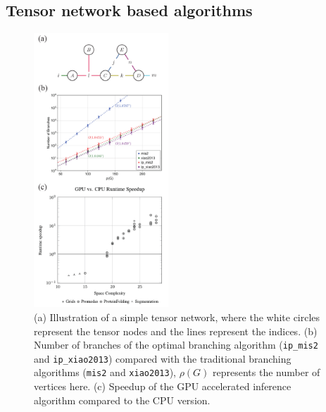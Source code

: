 
\subsection{Tensor network based algorithms}

\begin{figure}[h]
    \centering
    \includegraphics[width=0.45\textwidth]{figs/tn_onec.pdf}
    \caption{(a) Illustration of a simple tensor network, where the white circles represent the tensor nodes and the lines represent the indices. (b) Number of branches of the optimal branching algorithm (\texttt{ip\_mis2} and \texttt{ip\_xiao2013}) compared with the traditional branching algorithms (\texttt{mis2} and \texttt{xiao2013}), $\rho(G)$ represents the number of vertices here. (c) Speedup of the GPU accelerated inference algorithm compared to the CPU version.}
    \label{fig:tn}
\end{figure}

